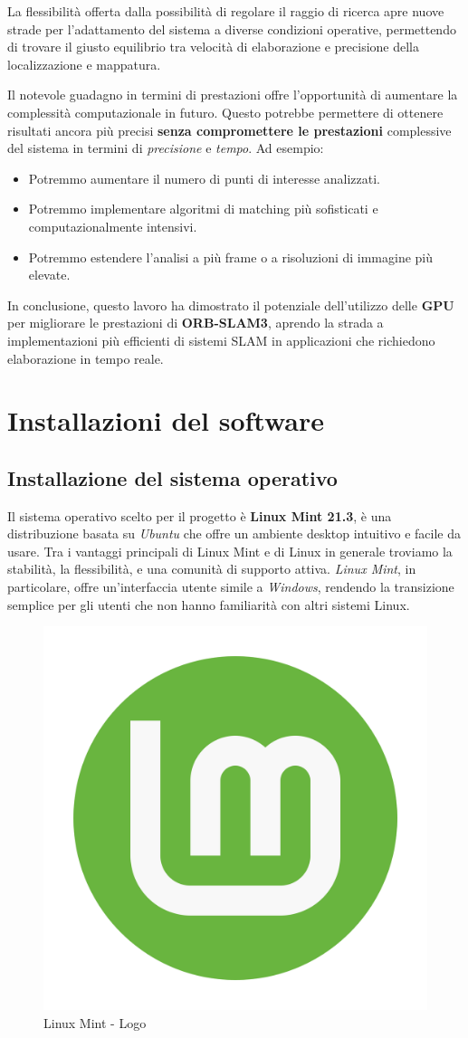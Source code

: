 \documentclass[12pt,a4paper]{report}
\begin{document}
La flessibilità offerta dalla possibilità di regolare il raggio di ricerca apre nuove strade per l'adattamento del sistema a diverse condizioni operative, permettendo di trovare il giusto equilibrio tra velocità di elaborazione e precisione della localizzazione e mappatura.

Il notevole guadagno in termini di prestazioni offre l'opportunità di aumentare la complessità computazionale in futuro. Questo potrebbe permettere di ottenere risultati ancora più precisi \textbf{senza compromettere le prestazioni} complessive del sistema in termini di \textit{precisione} e \textit{tempo}. Ad esempio:
\begin{itemize}
\item Potremmo aumentare il numero di punti di interesse analizzati.
\item Potremmo implementare algoritmi di matching più sofisticati e computazionalmente intensivi.
\item Potremmo estendere l'analisi a più frame o a risoluzioni di immagine più elevate.
\end{itemize}

In conclusione, questo lavoro ha dimostrato il potenziale dell'utilizzo delle \textbf{GPU} per migliorare le prestazioni di \textbf{ORB-SLAM3}, aprendo la strada a implementazioni più efficienti di sistemi SLAM in applicazioni che richiedono elaborazione in tempo reale.


\appendix

\chapter{Installazioni del software}

\section{Installazione del sistema operativo}

Il sistema operativo scelto per il progetto è \textbf{Linux Mint 21.3}, è una distribuzione basata su \textit{Ubuntu} che offre un ambiente desktop intuitivo e facile da usare. Tra i vantaggi principali di Linux Mint e di Linux in generale troviamo la stabilità, la flessibilità, e una comunità di supporto attiva. \textit{Linux Mint}, in particolare, offre un'interfaccia utente simile a \textit{Windows}, rendendo la transizione semplice per gli utenti che non hanno familiarità con altri sistemi Linux.

\begin{figure}[h]
    \centering
    \includegraphics[width=0.2\linewidth]{img/mint_logo.png}
    \caption{Linux Mint - Logo}
\end{figure}
\end{document}
